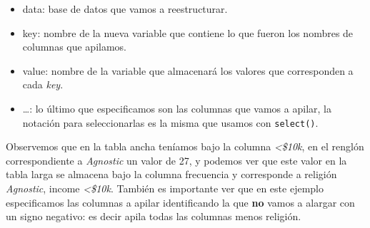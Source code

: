 \documentclass[
]{book}
\newenvironment{Shaded}{\begin{snugshade}}{\end{snugshade}}
\newcommand{\AttributeTok}[1]{\textcolor[rgb]{0.77,0.63,0.00}{#1}}
\newcommand{\CommentTok}[1]{\textcolor[rgb]{0.56,0.35,0.01}{\textit{#1}}}
\newcommand{\FunctionTok}[1]{\textcolor[rgb]{0.00,0.00,0.00}{#1}}
\newcommand{\NormalTok}[1]{#1}
\newcommand{\OtherTok}[1]{\textcolor[rgb]{0.56,0.35,0.01}{#1}}
\newcommand{\SpecialCharTok}[1]{\textcolor[rgb]{0.00,0.00,0.00}{#1}}
\providecommand{\tightlist}{%
  \setlength{\itemsep}{0pt}\setlength{\parskip}{0pt}}
\begin{document}
\begin{itemize}
\tightlist
\item
  data: base de datos que vamos a reestructurar.\\
\item
  key: nombre de la nueva variable que contiene lo que fueron los nombres
  de columnas que apilamos.\\
\item
  value: nombre de la variable que almacenará los valores que corresponden a
  cada \emph{key}.\\
\item
  \ldots: lo último que especificamos son las columnas que vamos a apilar, la notación para seleccionarlas es la misma que usamos con \texttt{select()}.
\end{itemize}

\begin{Shaded}
\end{Shaded}

Observemos que en la tabla ancha teníamos bajo la columna \emph{\textless\$10k}, en el renglón
correspondiente a \emph{Agnostic} un valor de 27, y podemos ver que este valor en
la tabla larga se almacena bajo la columna frecuencia y corresponde a religión
\emph{Agnostic}, income \emph{\textless\$10k}. También es importante ver que en este ejemplo
especificamos las columnas a apilar identificando la que \textbf{no} vamos a alargar
con un signo negativo: es decir apila todas las columnas menos religión.
\end{document}
